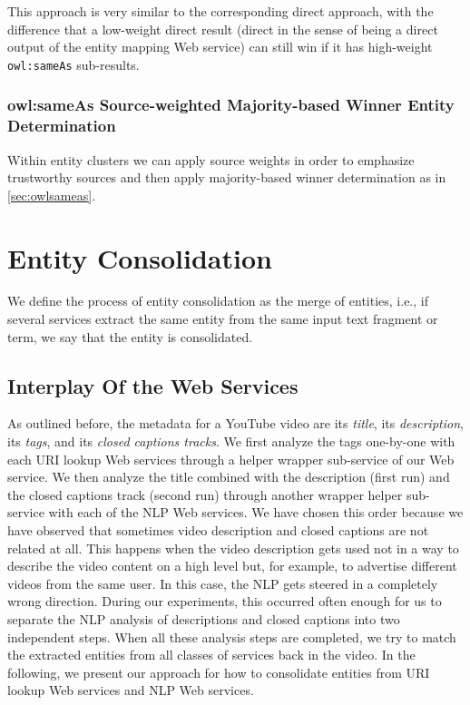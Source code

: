 \documentclass[twocolumn]{article}
\begin{document}
This approach is very similar to the corresponding direct approach, with the difference that a low-weight direct result
(direct in the sense of being a direct output of the entity mapping Web service) can still win if it has high-weight
\texttt{owl:sameAs} sub-results.

\subsubsection{owl:sameAs Source-weighted Majority-based Winner Entity Determination}

Within entity clusters we can apply source weights in order to emphasize trustworthy sources and then apply
majority-based winner determination as in \ref{sec:owlsameas}.

\section{Entity Consolidation}                                              \label{sec:consolidation}
We define the process of entity consolidation as the merge of entities, i.e., if several services extract the same
entity from the same input text fragment or term, we say that the entity is consolidated.

\subsection{Interplay Of the Web Services}                                  \label{sec:interplay}
As outlined before, the metadata for a YouTube video are its \textit{title}, its \textit{description}, its \textit{tags}, and its \textit{closed captions
tracks}. We first analyze the tags one-by-one with each URI lookup Web services through a helper wrapper sub-service of our Web service. We then
analyze the title combined with the description (first run) and the closed captions track (second run) through another wrapper helper sub-service with each of the NLP Web services. We have chosen this order because we have observed that sometimes video description
and closed captions are not related at all. This happens when the video description gets used not in a way to describe
the video content on a high level but, for example, to advertise different videos from the same user. In this case, the
NLP gets steered in a completely wrong direction. During our experiments, this occurred often enough for us to separate
the NLP analysis of descriptions and closed captions into two independent steps. When all these analysis steps are completed,
we try to match the extracted entities from all classes of services back in the video. In the following, we present our
approach for how to consolidate entities from URI lookup Web services and NLP Web services.
\end{document}
